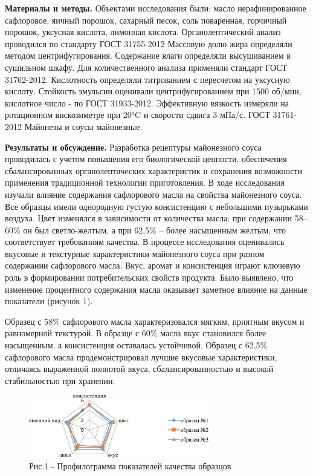 \begin{multicols}{2}
{\bfseries Материалы и методы.} Объектами исследования были: масло
нерафинированное сафлоровое, яичный порошок, сахарный песок, соль
поваренная, горчичный порошок, уксусная кислота, лимонная кислота.
Органолептический анализ проводился по стандарту ГОСТ 31755-2012
Массовую долю жира определяли методом центрифугирования. Содержание
влаги определяли высушиванием в сушильном шкафу. Для количественного
анализа применяли стандарт ГОСТ 31762-2012. Кислотность определяли
титрованием с пересчетом на уксусную кислоту. Стойкость эмульсии
оценивали центрифугированием при 1500 об/мин, кислотное число - по ГОСТ
31933-2012. Эффективную вязкость измеряли на ротационном вискозиметре
при 20°C и скорости сдвига 3 мПа/с. ГОСТ 31761- 2012 Майонезы и соусы
майонезные.

{\bfseries Результаты и обсуждение.} Разработка рецептуры майонезного соуса
проводилась с учетом повышения его биологической ценности, обеспечения
сбалансированных органолептических характеристик и сохранения
возможности применения традиционной технологии приготовления. В ходе
исследования изучали влияние содержания сафлорового масла на свойства
майонезного соуса. Все образцы имели однородную густую консистенцию с
небольшими пузырьками воздуха. Цвет изменялся в зависимости от
количества масла: при содержании 58--60\% он был светло-желтым, а при
62,5\% -- более насыщенным желтым, что соответствует требованиям
качества. В процессе исследования оценивались вкусовые и текстурные
характеристики майонезного соуса при разном содержании сафлорового
масла. Вкус, аромат и консистенция играют ключевую роль в формировании
потребительских свойств продукта. Было выявлено, что изменение
процентного содержания масла оказывает заметное влияние на данные
показатели (рисунок 1).

Образец с 58\% сафлорового масла характеризовался мягким, приятным
вкусом и равномерной текстурой. В образце с 60\% масла вкус становился
более насыщенным, а консистенция оставалась устойчивой. Образец с 62,5\%
сафлорового масла продемонстрировал лучшие вкусовые характеристики,
отличаясь выраженной полнотой вкуса, сбалансированностью и высокой
стабильностью при хранении.
\end{multicols}

\begin{figure}[H]
	\centering
	\includegraphics[width=0.7\textwidth]{media/pish4/image6}
	\caption*{Рис.1 - Профилограмма показателей качества образцов}
\end{figure}

